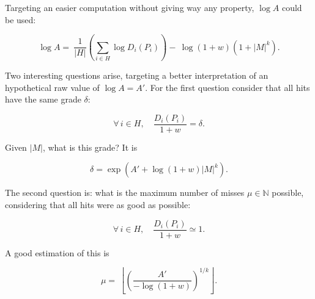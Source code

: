 \documentclass{article}
\begin{document}
      Targeting an easier computation without giving way any property, $\log A$
      could be used:

      $$
      \log A = \
      \frac{1}{|H|}\left(\sum_{i \in H} \log D_i(P_i)\right) - \
      \log(1 + w) (1 + |M|^k) .
      $$

      Two interesting questions arise, targeting a better interpretation of an
      hypothetical raw value of $\log A = A'$. For the first question consider
      that all hits have the same grade $\delta$:

      $$ \forall\, i \in H, \quad \frac{D_i(P_i)}{1 + w} = \delta. $$

      Given $|M|$, what is this grade? It is

      $$ \delta = \exp\left( A' + \log(1 + w) |M|^k \right).$$

      The second question is: what is the maximum number of misses $\mu \in
      \mathbb{N}$ possible, considering that all hits were as good as possible:

      $$ \forall\, i \in H, \quad \frac{D_i(P_i)}{1 + w} \simeq 1. $$

      A good estimation of this is

      $$
      \mu = \
      \left\lfloor \left(\frac{A'}{-\log(1+w)}\right)^{1/k} \right\rfloor.
      $$
\end{document}
